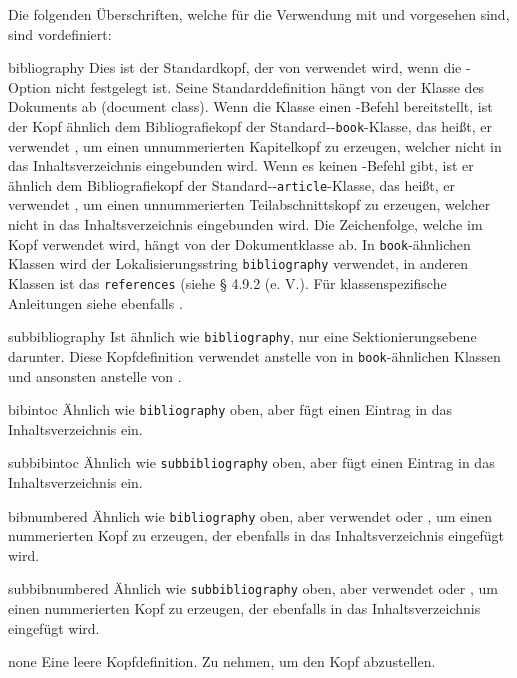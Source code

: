 \documentclass{ltxdockit}[2011/03/25]
\begin{document}
Die folgenden Überschriften, welche für die Verwendung mit
 und  vorgesehen sind, sind
vordefiniert:

\begin{valuelist*}

\item[bibliography] Dies ist der Standardkopf, der von 
verwendet wird, wenn die -Option nicht festgelegt ist. Seine
Standarddefinition hängt von der Klasse des Dokuments ab (document class). Wenn
die Klasse einen -Befehl bereitstellt, ist der Kopf ähnlich dem
Bibliografiekopf der Standard-\latex-\texttt{book}-Klasse, das heißt, er
verwendet , um einen unnummerierten Kapitelkopf zu erzeugen,
welcher nicht in das Inhaltsverzeichnis eingebunden wird. Wenn es keinen
-Befehl gibt, ist er ähnlich dem Bibliografiekopf der
Standard-\latex-\texttt{article}-Klasse, das heißt, er verwendet , um
einen unnummerierten Teilabschnittskopf zu erzeugen, welcher nicht in das
Inhaltsverzeichnis eingebunden wird. Die Zeichenfolge, welche im Kopf verwendet
wird, hängt von der Dokumentklasse ab. In \texttt{book}-ähnlichen Klassen wird
der Lokalisierungsstring \texttt{bibliography} verwendet, in anderen Klassen ist
das \texttt{references} (siehe § 4.9.2 (e. V.). %
Für klassenspezifische
Anleitungen siehe ebenfalls .

\item[subbibliography] Ist ähnlich wie \texttt{bibliography}, nur eine
Sektionierungsebene darunter. Diese Kopfdefinition verwendet 
anstelle von  in \texttt{book}-ähnlichen Klassen und ansonsten
 anstelle von .

\item[bibintoc] Ähnlich wie \texttt{bibliography} oben, aber fügt einen
Eintrag in das Inhaltsverzeichnis ein.

\item[subbibintoc] Ähnlich wie \texttt{subbibliography} oben, aber fügt einen
Eintrag in das Inhaltsverzeichnis ein.

\item[bibnumbered] Ähnlich wie \texttt{bibliography} oben, aber verwendet
 oder , um einen nummerierten Kopf zu erzeugen, der
ebenfalls in das Inhaltsverzeichnis eingefügt wird.

\item[subbibnumbered] Ähnlich wie \texttt{subbibliography} oben, aber verwendet
 oder , um einen nummerierten Kopf zu erzeugen, der
ebenfalls in das Inhaltsverzeichnis eingefügt wird.

\item[none]
Eine leere Kopfdefinition. Zu nehmen, um den Kopf abzustellen.

\end{valuelist*}
\end{document}
